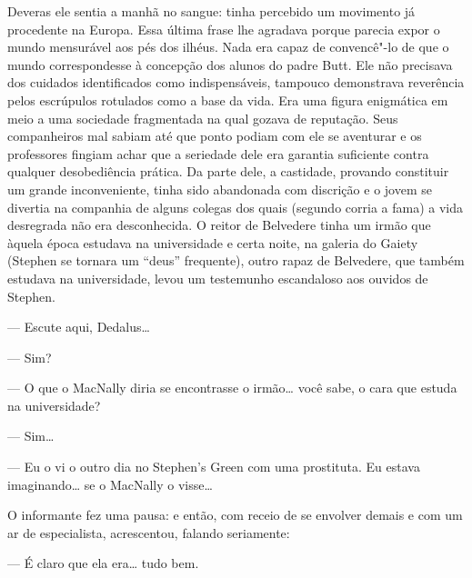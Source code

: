 Deveras ele sentia a manhã no sangue: tinha percebido um movimento
já procedente \label{na"-europa} na Europa.  Essa última frase lhe agradava porque
parecia expor o mundo mensurável aos pés dos ilhéus.  Nada era capaz de
convencê"-lo de que o mundo correspondesse à concepção dos alunos do
padre Butt.  Ele não precisava dos cuidados identificados como
indispensáveis, tampouco demonstrava reverência pelos escrúpulos
rotulados como a base da vida.  Era uma figura enigmática em meio a uma
sociedade fragmentada na qual gozava de reputação.  Seus companheiros
mal sabiam até que ponto podiam com ele se aventurar e os professores
fingiam achar que a seriedade dele era garantia suficiente contra
qualquer desobediência prática.  Da parte dele, a castidade, provando
constituir um grande inconveniente, tinha sido abandonada com discrição
e o jovem se divertia na companhia de alguns colegas dos quais (segundo
corria a fama) a vida desregrada não era desconhecida.  O reitor de
Belvedere tinha um irmão que àquela época estudava na universidade e
certa noite, na galeria do Gaiety (Stephen se tornara um “deus”
frequente), outro rapaz de Belvedere, \label{que"-tambem} que também estudava na
universidade, levou um testemunho escandaloso aos ouvidos de Stephen.

--- Escute aqui, Dedalus\ldots{}

--- Sim?

--- O que o MacNally diria se encontrasse o irmão\ldots{} você sabe, o
cara que estuda na universidade?

--- Sim\ldots{}

--- Eu o vi o outro dia no Stephen’s Green com uma prostituta.
Eu estava imaginando\ldots{} se o MacNally o visse\ldots{}

O informante fez uma pausa: e então, com receio de se envolver
demais e com um ar de especialista, acrescentou, falando seriamente:

--- É claro que ela era\ldots{} tudo bem.

